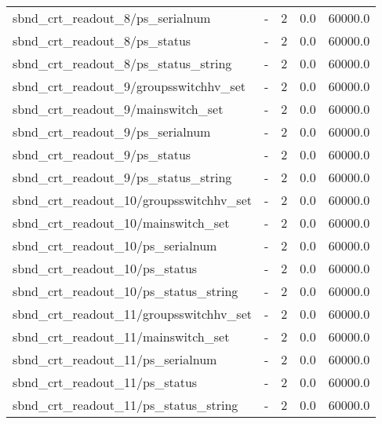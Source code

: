\begin{center}
\begin{longtable}{l | l l l l }
sbnd\_crt\_readout\_8/ps\_serialnum & - & 2 & 0.0 & 60000.0\\ 
sbnd\_crt\_readout\_8/ps\_status & - & 2 & 0.0 & 60000.0\\ 
sbnd\_crt\_readout\_8/ps\_status\_string & - & 2 & 0.0 & 60000.0\\ 
sbnd\_crt\_readout\_9/groupsswitchhv\_set & - & 2 & 0.0 & 60000.0\\ 
sbnd\_crt\_readout\_9/mainswitch\_set & - & 2 & 0.0 & 60000.0\\ 
sbnd\_crt\_readout\_9/ps\_serialnum & - & 2 & 0.0 & 60000.0\\ 
sbnd\_crt\_readout\_9/ps\_status & - & 2 & 0.0 & 60000.0\\ 
sbnd\_crt\_readout\_9/ps\_status\_string & - & 2 & 0.0 & 60000.0\\ 
sbnd\_crt\_readout\_10/groupsswitchhv\_set & - & 2 & 0.0 & 60000.0\\ 
sbnd\_crt\_readout\_10/mainswitch\_set & - & 2 & 0.0 & 60000.0\\ 
sbnd\_crt\_readout\_10/ps\_serialnum & - & 2 & 0.0 & 60000.0\\ 
sbnd\_crt\_readout\_10/ps\_status & - & 2 & 0.0 & 60000.0\\ 
sbnd\_crt\_readout\_10/ps\_status\_string & - & 2 & 0.0 & 60000.0\\ 
sbnd\_crt\_readout\_11/groupsswitchhv\_set & - & 2 & 0.0 & 60000.0\\ 
sbnd\_crt\_readout\_11/mainswitch\_set & - & 2 & 0.0 & 60000.0\\ 
sbnd\_crt\_readout\_11/ps\_serialnum & - & 2 & 0.0 & 60000.0\\ 
sbnd\_crt\_readout\_11/ps\_status & - & 2 & 0.0 & 60000.0\\ 
sbnd\_crt\_readout\_11/ps\_status\_string & - & 2 & 0.0 & 60000.0\\ 

\hline
\end{longtable}
\end{center}


